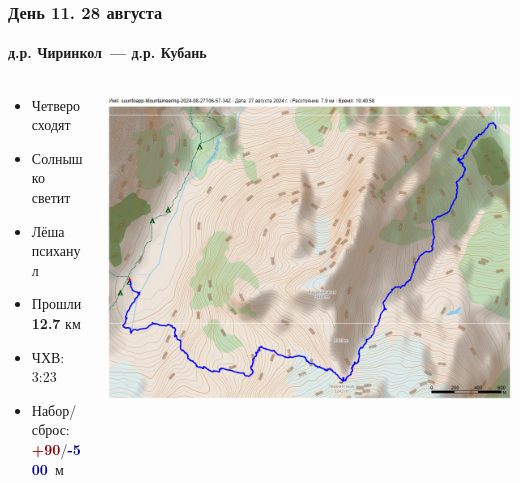 \begin{frame}
	\frametitle{День 11. 28 августа}
	\framesubtitle{д.р. Чиринкол~--- д.р. Кубань} %
	\begin{columns}[c] %
		\begin{column}{0.55\textwidth} %
			\begin{itemize}
				\item Четверо сходят
				\item Солнышко светит
				\item Лёша психанул
				\item Прошли \textbf{12.7} км
				\item ЧХВ: 3:23
				\item Набор/сброс: \textcolor{darkred}{\textbf{+90}}/\textcolor{darkblue}{\textbf{-500}}~м
			\end{itemize}			
		\end{column}
		\begin{column}{0.45\textwidth} %
			\centering
			\includegraphics[width=\linewidth]{../pics/mini_maps/27}
		\end{column}
	\end{columns}
\end{frame}

